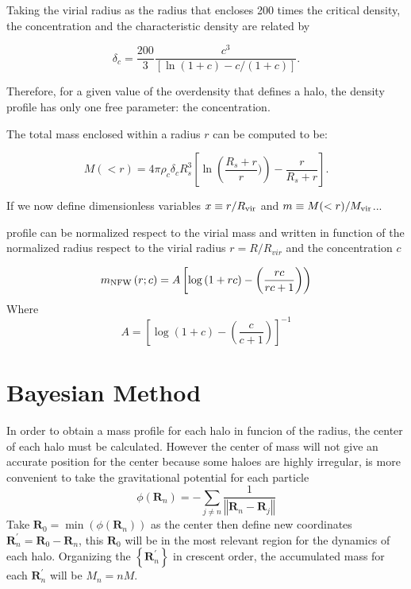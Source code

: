 \documentclass[useAMS,usenatbib]{mn2e}
\begin{document}
Taking the virial radius as the radius that encloses 200 times the
critical density, the concentration and the characteristic density are
related by 

\begin{equation}
\delta_c =\frac{200}{3}\frac{c^3}{[\ln(1+c)-c/(1+c)]}.
\end{equation}

Therefore, for a given value of the overdensity that defines a halo,
the density profile has only one free parameter: the concentration.


The total mass enclosed within a radius $r$ can be computed to be:

\begin{equation}
M(<r) = 4\pi\rho_c\delta_c  R_s^3\left[\ln \left
  (\frac{R_s+r}{r})\right) - \frac{r}{R_s+r}\right].
\end{equation}

If we now define dimensionless variables $x\equiv r/R_{\rm vir}$ and
$m\equiv M(<r)/M_{\rm vir}$...

profile can be normalized respect to the
virial mass and written in function of the normalized radius respect
to the virial radius $r=R/R_{vir}$ and the concentration $c$  



\begin{equation}
m_{\rm NFW}\left(r;c\right)=A\left[\log\left(1+rc\right)-\left(\frac{rc}{rc+1}\right)\right) 
\end{equation}
Where
\begin{equation}
A=\left[\log\left(1+c\right)-\left(\frac{c}{c+1}\right)\right]^{-1} 
\end{equation}

\section{Bayesian Method}
\label{sec:method}

In order to obtain a mass profile for each halo in funcion of the radius, the center of each halo must be calculated. However the center of mass will not give an accurate position for the center because some haloes are highly irregular, is more convenient to take the gravitational potential for each particle
\[
\phi\left(\boldsymbol{R}_{n}\right)=-\sum_{j\neq n}\frac{1}{\left\Vert \boldsymbol{R}_{n}-\boldsymbol{R}_{j}\right\Vert }
\]
Take $\boldsymbol{R}_{0}=\min\left(\phi\left(\boldsymbol{R}_{n}\right)\right)$ as the center then define new coordinates $\boldsymbol{R}_{n}^{\prime}=\boldsymbol{R}_{0}-\boldsymbol{R}_{n}$, this $\boldsymbol{R}_{0}$ will be in the most relevant region for the dynamics of each halo. Organizing the $\left\{ \boldsymbol{R}_{n}^{\prime}\right\} $ in crescent order, the accumulated mass for each $\boldsymbol{R}_{n}^{\prime}$ will be $M_{n}=nM$.
\end{document}
